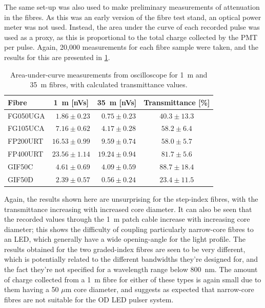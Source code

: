 \documentclass[a4paper,11pt]{article}
\begin{document}
The same set-up was also used to make preliminary measurements of attenuation in the fibres. As this was an early version of the fibre test stand, an optical power meter was not used. Instead, the area under the curve of each recorded pulse was used as a proxy, as this is proportional to the total charge collected by the PMT per pulse. Again, 20,000 measurements for each fibre sample were taken, and the results for this are presented in \cref{tab:attinit}.
\begin{table}[h]
\centering
\begin{tabular}{lccc}
\hline
Fibre	   & 1~m [nVs]  & 35~m [nVs] &  Transmittance [\%]	\\ \hline
FG050UGA   &  $\phantom{0}1.86\pm0.23$     &   $\phantom{0}0.75\pm0.23$     & \phantom{0}$40.3\pm13.3$     \\
FG105UCA   &  $\phantom{0}7.16\pm0.62$	    &   $\phantom{0}4.17\pm0.28$    & $58.2\pm6.4$     \\
FP200URT   &  $16.53\pm0.99$				&  	$\phantom{0}9.59\pm0.74$  	& $58.0\pm5.7$     \\
FP400URT   &  $23.56\pm1.14$    			&   $19.24\pm0.94$	 			& $81.7\pm5.6$     \\
GIF50C     &  $\phantom{0}4.61\pm0.69$     &   $\phantom{0}4.09\pm0.59$	 	& \phantom{0}$88.7\pm18.4$     \\
GIF50D     &  $\phantom{0}2.39\pm0.57$     &   $\phantom{0}0.56\pm0.24$     & \phantom{0}$23.4\pm11.5$    \\ \hline
\end{tabular}
\caption{Area-under-curve measurements from oscilloscope for 1~m and 35~m fibres, with calculated transmittance values.}\label{tab:attinit}
\end{table}
Again, the results shown here are unsurprising for the step-index fibres, with the transmittance increasing with increased core diameter. It can also be seen that the recorded values through the 1~m patch cable increase with increasing core diameter; this shows the difficulty of coupling particularly narrow-core fibres to an LED, which generally have a wide opening-angle for the light profile. The results obtained for the two graded-index fibres are seen to be very different, which is potentially related to the different bandwidths they're designed for, and the fact they're not specified for a wavelength range below 800~nm. The amount of charge collected from a 1~m fibre for either of these types is again small due to them having a 50 $\mu$m core diameter, and suggests as expected that narrow-core fibres are not suitable for the OD LED pulser system.
\end{document}
